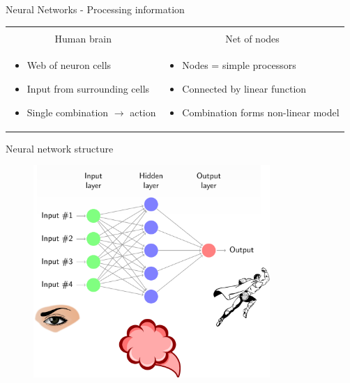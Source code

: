 \begin{frame}{Neural Networks - Processing information}
\begin{tabular}{p{5cm}|p{5cm}}
\begin{itemize}
    \end{itemize} \\
\multicolumn{1}{c|}{Human brain} & \multicolumn{1}{c}{Net of nodes} \\
    \begin{itemize}
        \item Web of neuron cells
        \item Input from surrounding cells
        \item Single combination $\rightarrow$ action
    \end{itemize}
    & 
    \begin{itemize}
      \item Nodes = simple processors
      \item Connected by linear function
      \item Combination forms non-linear model
    \end{itemize} 
 \end{tabular}
\end{frame}


\begin{frame}{Neural network structure}
\begin{figure}
\centering
\includegraphics[width=0.8\textwidth]{net_structure}
\end{figure}
\end{frame}

